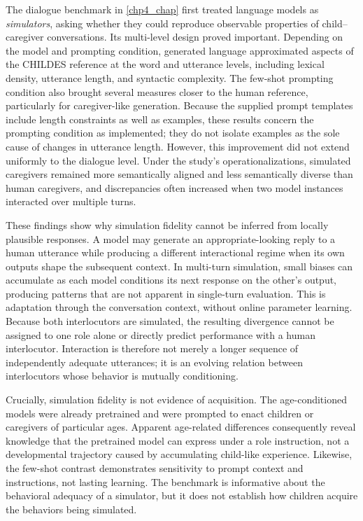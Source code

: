 The dialogue benchmark in \cref{chp4_chap} first treated language models as \emph{simulators}, asking whether they could reproduce observable properties of child--caregiver conversations. Its multi-level design proved important. Depending on the model and prompting condition, generated language approximated aspects of the CHILDES reference at the word and utterance levels, including lexical density, utterance length, and syntactic complexity. The few-shot prompting condition also brought several measures closer to the human reference, particularly for caregiver-like generation. Because the supplied prompt templates include length constraints as well as examples, these results concern the prompting condition as implemented; they do not isolate examples as the sole cause of changes in utterance length. However, this improvement did not extend uniformly to the dialogue level. Under the study's operationalizations, simulated caregivers remained more semantically aligned and less semantically diverse than human caregivers, and discrepancies often increased when two model instances interacted over multiple turns.

These findings show why simulation fidelity cannot be inferred from locally plausible responses. A model may generate an appropriate-looking reply to a human utterance while producing a different interactional regime when its own outputs shape the subsequent context. In multi-turn simulation, small biases can accumulate as each model conditions its next response on the other's output, producing patterns that are not apparent in single-turn evaluation. This is adaptation through the conversation context, without online parameter learning. Because both interlocutors are simulated, the resulting divergence cannot be assigned to one role alone or directly predict performance with a human interlocutor. Interaction is therefore not merely a longer sequence of independently adequate utterances; it is an evolving relation between interlocutors whose behavior is mutually conditioning.

Crucially, simulation fidelity is not evidence of acquisition. The age-conditioned models were already pretrained and were prompted to enact children or caregivers of particular ages. Apparent age-related differences consequently reveal knowledge that the pretrained model can express under a role instruction, not a developmental trajectory caused by accumulating child-like experience. Likewise, the few-shot contrast demonstrates sensitivity to prompt context and instructions, not lasting learning. The benchmark is informative about the behavioral adequacy of a simulator, but it does not establish how children acquire the behaviors being simulated.

